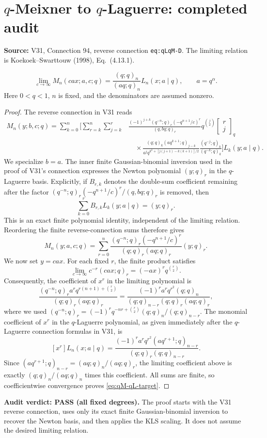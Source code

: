 \documentclass[11pt]{article}
\begin{document}
\section{$q$-Meixner to $q$-Laguerre: completed audit}
\noindent\textbf{Source:} V31, Connection 94, reverse connection
\texttt{eq:qLqM-D}. The limiting relation is Koekoek--Swarttouw
(1998), Eq.~(4.13.1).

\begin{equation}\label{eq:qM-qL-target}
\boxed{\lim_{c\to\infty}M_n(cax;a,c;q)
=\frac{(q;q)_n}{(aq;q)_n}L_n(x;a\mid q),\qquad a=q^\alpha.}
\end{equation}
Here $0<q<1$, $n$ is fixed, and the denominators are assumed nonzero.

\begin{proof}
The reverse connection in V31 reads
\begin{align*}
M_n(y;b,c;q)=\sum_{k=0}^n\Biggl[\sum_{r=k}^n\sum_{j=k}^r
&\frac{(-1)^{j+k}(q^{-n};q)_r(-q^{n+1}/c)^r}
{(q,bq;q)_r}q^{\binom j2}\begin{bmatrix}r\\j\end{bmatrix}_q\\[-2pt]
&\quad\times\frac{(q;q)_k(aq^{k+1};q)_{j-k}}
{a^jq^{k^2+[j(j+1)-k(k+1)]/2}}
\frac{(q^{-j};q)_k}{(q^{-k};q)_k}\Biggr]L_k(y;a\mid q).
\end{align*}
We specialize $b=a$. The inner finite Gaussian-binomial inversion
used in the proof of V31's connection expresses the Newton polynomial
$(y;q)_r$ in the $q$-Laguerre basis. Explicitly, if $B_{r,k}$ denotes
the double-sum coefficient remaining after the factor
$(q^{-n};q)_r(-q^{n+1}/c)^r/(q,bq;q)_r$ is removed, then
\[
\sum_{k=0}^r B_{r,k}L_k(y;a\mid q)=(y;q)_r.
\]
This is an exact finite polynomial identity, independent of the
limiting relation. Reordering the finite reverse-connection sums
therefore gives
\begin{equation}\label{eq:qM-qL-newton}
M_n(y;a,c;q)=\sum_{r=0}^n
\frac{(q^{-n};q)_r(-q^{n+1}/c)^r}
{(q;q)_r(aq;q)_r}(y;q)_r.
\end{equation}
We now set $y=cax$. For each fixed $r$, the finite product satisfies
\[
\lim_{c\to\infty}c^{-r}(cax;q)_r
=(-ax)^r q^{\binom r2}.
\]
Consequently, the coefficient of $x^r$ in the limiting polynomial is
\[
\frac{(q^{-n};q)_r a^r
q^{r(n+1)+\binom r2}}{(q;q)_r(aq;q)_r}
=\frac{(-1)^r a^r q^{r^2}(q;q)_n}
{(q;q)_{n-r}(q;q)_r(aq;q)_r},
\]
where we used
$(q^{-n};q)_r=(-1)^rq^{-nr+\binom r2}
(q;q)_n/(q;q)_{n-r}$.
The monomial coefficient of $x^r$ in the $q$-Laguerre polynomial,
as given immediately after the $q$-Laguerre connection formulas
in V31, is
\[
[x^r]L_n(x;a\mid q)
=\frac{(-1)^ra^rq^{r^2}(aq^{r+1};q)_{n-r}}
{(q;q)_r(q;q)_{n-r}}.
\]
Since $(aq^{r+1};q)_{n-r}=(aq;q)_n/(aq;q)_r$,
the limiting coefficient above is exactly
$(q;q)_n/(aq;q)_n$ times this coefficient. All sums are finite,
so coefficientwise convergence proves \eqref{eq:qM-qL-target}.
\end{proof}
\noindent\textbf{Audit verdict: PASS (all fixed degrees).}
The proof starts with the V31 reverse connection, uses only its exact
finite Gaussian-binomial inversion to recover the Newton basis,
and then applies the KLS scaling. It does not assume the desired
limiting relation.
\end{document}
